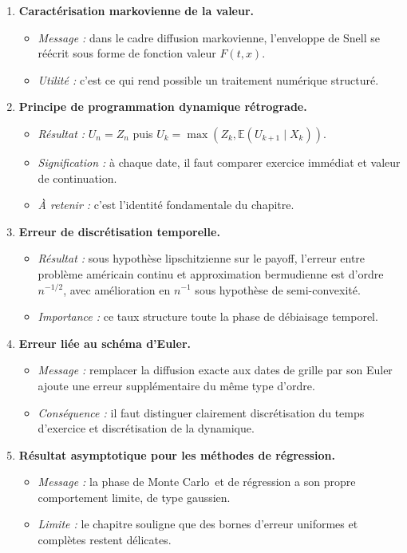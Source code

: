 \documentclass[11pt,a4paper]{article}
\newcommand{\E}{\mathbb{E}}
\newcommand{\mc}{Monte Carlo}
\begin{document}
\begin{enumerate}[label=\textbf{\arabic*.}]
  \item \textbf{Caractérisation markovienne de la valeur.}
  \begin{itemize}
    \item \emph{Message :} dans le cadre diffusion markovienne, l'enveloppe de Snell se réécrit sous forme de fonction valeur $F(t,x)$.
    \item \emph{Utilité :} c'est ce qui rend possible un traitement numérique structuré.
  \end{itemize}

  \item \textbf{Principe de programmation dynamique rétrograde.}
  \begin{itemize}
    \item \emph{Résultat :} $U_n=Z_n$ puis $U_k=\max(Z_k,\E(U_{k+1}\mid X_k))$.
    \item \emph{Signification :} à chaque date, il faut comparer exercice immédiat et valeur de continuation.
    \item \emph{À retenir :} c'est l'identité fondamentale du chapitre.
  \end{itemize}

  \item \textbf{Erreur de discrétisation temporelle.}
  \begin{itemize}
    \item \emph{Résultat :} sous hypothèse lipschitzienne sur le payoff, l'erreur entre problème américain continu et approximation bermudienne est d'ordre $n^{-1/2}$, avec amélioration en $n^{-1}$ sous hypothèse de semi-convexité.
    \item \emph{Importance :} ce taux structure toute la phase de débiaisage temporel.
  \end{itemize}

  \item \textbf{Erreur liée au schéma d'Euler.}
  \begin{itemize}
    \item \emph{Message :} remplacer la diffusion exacte aux dates de grille par son Euler ajoute une erreur supplémentaire du même type d'ordre.
    \item \emph{Conséquence :} il faut distinguer clairement discrétisation du temps d'exercice et discrétisation de la dynamique.
  \end{itemize}

  \item \textbf{Résultat asymptotique pour les méthodes de régression.}
  \begin{itemize}
    \item \emph{Message :} la phase de \mc\ et de régression a son propre comportement limite, de type gaussien.
    \item \emph{Limite :} le chapitre souligne que des bornes d'erreur uniformes et complètes restent délicates.
  \end{itemize}


\end{enumerate}
\end{document}
